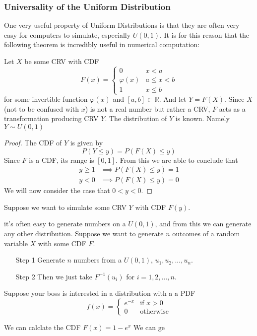 \documentclass{report}
\begin{document}
\subsubsection{Universality of the Uniform Distribution}
One very useful property of Uniform Distributions is that they are often very easy for computers to simulate, especially $U(0,1)$. It is for this reason that the following theorem is incredibly useful in numerical computation:
\begin{theorem}
    Let $X$ be some CRV with CDF 
    \[
        F(x)=\begin{cases}
            0 & x<a
            \\
            \varphi(x) & a\le x < b
            \\
            1 & x\le b
        \end{cases}
    \]
    for some invertible function $\varphi(x)$ and $[a,b]\subset\mathbb R$. And let $Y=F(X)$. Since $X$ (not to be confused with $x$) is not a real number but rather a CRV, $F$ acts as a transformation producing CRV $Y$. The distribution of $Y$ is known. Namely $Y\sim U(0,1)$
    \begin{proof}
        The CDF of $Y$ is given by
        \[
            P(Y\le y) = P(F(X)\le y)
        \]
        Since $F$ is a CDF, its range is $[0,1]$. From this we are able to conclude that 
        \begin{align*}
            y\ge 1 &\implies P(F(X)\le y)=1
            \\
            y<0 &\implies P(F(X)\le y)=0
        \end{align*}
        We will now consider the case that $0<y<0$.
    \end{proof}
\end{theorem}

Suppose we want to simulate some CRV $Y$ with CDF $F(y)$.


it's often easy to generate numbers on a $U(0,1)$, and from this we can generate any other distribution. Suppose we want to generate $n$ outcomes of a random variable $X$ with some CDF $F$. 
\begin{enumerate}
    \item[Step 1] Generate $n$ numbers from a $U(0,1)$, $u_1,u_2,...,u_n$.
    \item[Step 2] Then we just take $F^{-1}(u_i)$ for $i=1,2,...,n$. 
\end{enumerate}
\begin{example}
    Suppose your boss is interested in a distribution with a a PDF
    \[
        f(x)=\left\{\begin{array}{cc}
            e^{-x} & \text{if $x> 0$}\\
            0 & \text{otherwise}
            \end{array}\right.
    \]

    We can calclate the CDF $F(x)=1-e^x$ \todo\todo\todo
    We can ge\todo
\end{example}
\end{document}
